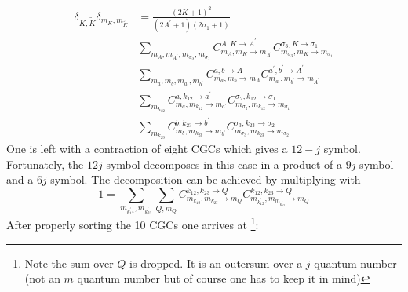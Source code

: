 \documentclass[a4paper,10pt,parskip=full]{scrartcl}
\begin{document}
\begin{equation}
  \begin{split}
  \delta_{K,\tilde{K}}\delta_{m_K,m_{\tilde{K}}}&=
  \frac{(2K+1)^2}{(2A^\prime+1)(2\sigma_1+1)}\\
  &\sum_{m_{A},m_{A^\prime},m_{\sigma_3},m_{\sigma_1}}C^{A,K\rightarrow
    A^\prime}_{m_A,m_{K}\rightarrow m_{A^\prime}}C^{\sigma_3,K\rightarrow\sigma_1}_{m_{\sigma_3},m_{K}\rightarrow
    m_{\sigma_1}}\\
  &\sum_{m_{a},m_{b},m_{a^\prime},m_{b^\prime}} C^{a,b\rightarrow A}_{{m_a,m_{b}}\rightarrow m_{A}}C^{a^\prime,b^\prime\rightarrow A^\prime}_{m_{a^\prime},m_{b^\prime}\rightarrow m_{A^\prime}}\\
  &\sum_{m_{k_{12}}}C^{a,k_{12}\rightarrow
    a^\prime}_{m_a,m_{k_{12}}\rightarrow
    m_{a^\prime}}C^{\sigma_2,k_{12}\rightarrow
    \sigma_1}_{m_{\sigma_2},m_{k_{12}}\rightarrow m_{\sigma_1}}\\
  &\sum_{m_{k_{23}}}C^{b,k_{23}\rightarrow b^\prime}_{m_b,m_{k_{23}}\rightarrow m_{b^\prime}}C^{\sigma_3,k_{23}\rightarrow \sigma_2}_{m_{\sigma_3},m_{k_{23}}\rightarrow m_{\sigma_2}}
  \end{split}
\end{equation}
One is left with a contraction of eight CGCs which gives a $12-j$
symbol. Fortunately, the $12j$ symbol decomposes in this case in a
product of a $9j$ symbol and a $6j$ symbol. The decomposition can be
achieved by multiplying with
\begin{equation}
1=\sum_{m_{k_{12}^\prime},m_{k_{23}^\prime}}\sum_{Q,m_{Q}}C^{k_{12},k_{23}\rightarrow Q}_{m_{k_{12}},m_{k_{23}}\rightarrow m_{Q}}C^{k_{12},k_{23}\rightarrow Q}_{m_{k_{12}^\prime},m_{m_{k_{12}^\prime}}\rightarrow m_{Q}}
\end{equation}
After properly sorting the 10 CGCs  one arrives at \footnote{Note the sum over
$Q$ is dropped. It is an outersum over a $j$ quantum number (not an
$m$ quantum number but of course one has to keep it in mind)}:
\end{document}
